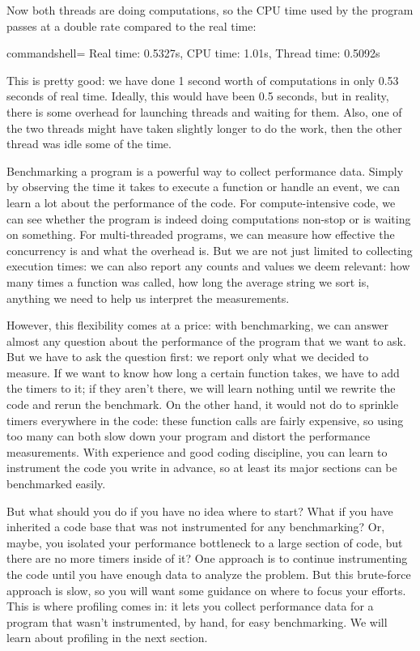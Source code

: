 Now both threads are doing computations, so the CPU time used by the program passes at a double rate compared to the real time:

\begin{tcblisting}{commandshell={}}
Real time: 0.5327s, CPU time: 1.01s, Thread time: 0.5092s
\end{tcblisting}

This is pretty good: we have done 1 second worth of computations in only 0.53 seconds of real time. Ideally, this would have been 0.5 seconds, but in reality, there is some overhead for launching threads and waiting for them. Also, one of the two threads might have taken slightly longer to do the work, then the other thread was idle some of the time.

Benchmarking a program is a powerful way to collect performance data. Simply by observing the time it takes to execute a function or handle an event, we can learn a lot about the performance of the code. For compute-intensive code, we can see whether the program is indeed doing computations non-stop or is waiting on something. For multi-threaded programs, we can measure how effective the concurrency is and what the overhead is. But we are not just limited to collecting execution times: we can also report any counts and values we deem relevant: how many times a function was called, how long the average string we sort is, anything we need to help us interpret the measurements.

However, this flexibility comes at a price: with benchmarking, we can answer almost any question about the performance of the program that we want to ask. But we have to ask the question first: we report only what we decided to measure. If we want to know how long a certain function takes, we have to add the timers to it; if they aren't there, we will learn nothing until we rewrite the code and rerun the benchmark. On the other hand, it would not do to sprinkle timers everywhere in the code: these function calls are fairly expensive, so using too many can both slow down your program and distort the performance measurements. With experience and good coding discipline, you can learn to instrument the code you write in advance, so at least its major sections can be benchmarked easily.

But what should you do if you have no idea where to start? What if you have inherited a code base that was not instrumented for any benchmarking? Or, maybe, you isolated your performance bottleneck to a large section of code, but there are no more timers  inside of it? One approach is to continue instrumenting the code until you have enough data to analyze the problem. But this brute-force approach is slow, so you will want some guidance on where to focus your efforts. This is where profiling comes in: it lets you collect performance data for a program that wasn't instrumented, by hand, for easy benchmarking. We will learn about profiling in the next section.






